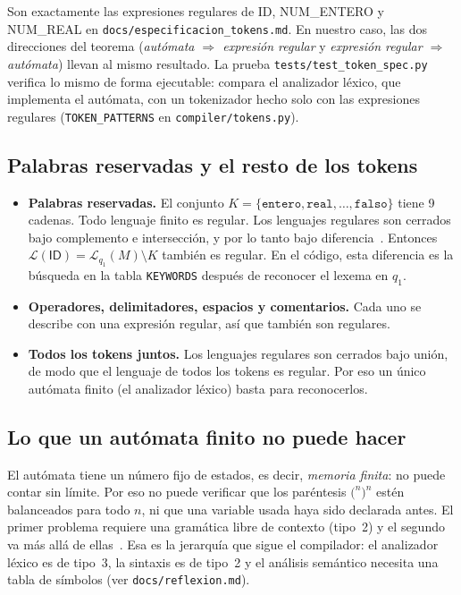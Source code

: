 \documentclass[11pt, a4paper]{article}
\theoremstyle{plain}
\theoremstyle{definition}
\newcommand{\lex}[1]{\texttt{#1}}             %
\newcommand{\Lang}{\mathcal{L}}
\begin{document}
Son exactamente las expresiones regulares de \textsf{ID}, \textsf{NUM\_ENTERO} y
\textsf{NUM\_REAL} en \nolinkurl{docs/especificacion_tokens.md}. En nuestro caso, las dos
direcciones del teorema (\emph{autómata $\Rightarrow$ expresión regular} y \emph{expresión
regular $\Rightarrow$ autómata}) llevan al mismo resultado. La prueba
\nolinkurl{tests/test_token_spec.py} verifica lo mismo de forma ejecutable: compara el
analizador léxico, que implementa el autómata, con un tokenizador hecho solo con las
expresiones regulares (\texttt{TOKEN\_PATTERNS} en \nolinkurl{compiler/tokens.py}).

\subsection{Palabras reservadas y el resto de los tokens}

\begin{itemize}
  \item \textbf{Palabras reservadas.} El conjunto $K = \{\lex{entero}, \lex{real},
    \dots, \lex{falso}\}$ tiene 9 cadenas. Todo lenguaje finito es regular. Los
    lenguajes regulares son cerrados bajo complemento e intersección, y por lo tanto bajo
    diferencia~\cite[sección~4.2]{hmu}. Entonces $\Lang(\textsf{ID}) = \Lang_{q_1}(M)
    \setminus K$ también es regular. En el código, esta diferencia es la búsqueda en la
    tabla \texttt{KEYWORDS} después de reconocer el lexema en $q_1$.
  \item \textbf{Operadores, delimitadores, espacios y comentarios.} Cada uno se describe
    con una expresión regular, así que también son regulares.
  \item \textbf{Todos los tokens juntos.} Los lenguajes regulares son cerrados bajo
    unión, de modo que el lenguaje de todos los tokens es regular. Por eso un único
    autómata finito (el analizador léxico) basta para reconocerlos.
\end{itemize}

\subsection{Lo que un autómata finito no puede hacer}

El autómata tiene un número fijo de estados, es decir, \emph{memoria finita}: no puede
contar sin límite. Por eso no puede verificar que los paréntesis $\lex{(}^n\lex{)}^n$
estén balanceados para todo $n$, ni que una variable usada haya sido declarada antes.
El primer problema requiere una gramática libre de contexto (tipo~2) y el segundo va más
allá de ellas~\cite{chomsky56, chomsky59}. Esa es la jerarquía que sigue el compilador:
el analizador léxico es de tipo~3, la sintaxis es de tipo~2 y el análisis semántico
necesita una tabla de símbolos (ver \nolinkurl{docs/reflexion.md}).
\end{document}
